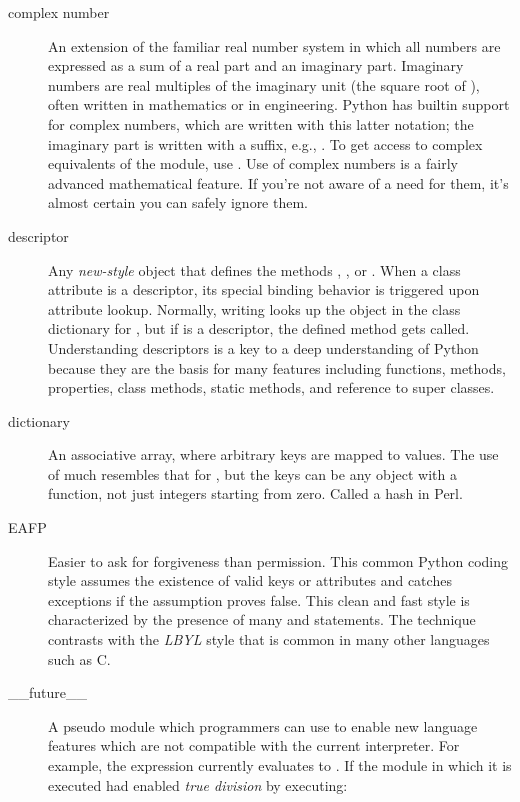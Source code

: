 \begin{description}
\item[complex number]

An extension of the familiar real number system in which all numbers are
expressed as a sum of a real part and an imaginary part.  Imaginary numbers
are real multiples of the imaginary unit (the square root of {}),
often written {} in mathematics or {} in engineering.
Python has builtin support for complex numbers, which are written with this
latter notation; the imaginary part is written with a {} suffix,
e.g., {}.  To get access to complex equivalents of the
{} module, use {}.  Use of complex numbers is a
fairly advanced mathematical feature.  If you're not aware of a need for them,
it's almost certain you can safely ignore them.

\item[descriptor]
Any \emph{new-style} object that defines the methods
{}, , or .
When a class attribute is a descriptor, its special binding behavior
is triggered upon attribute lookup.  Normally, writing  looks
up the object  in the class dictionary for , but if
{} is a descriptor, the defined method gets called.
Understanding descriptors is a key to a deep understanding of Python
because they are the basis for many features including functions,
methods, properties, class methods, static methods, and reference to
super classes.

\item[dictionary]
An associative array, where arbitrary keys are mapped to values.  The
use of  much resembles that for , but the keys
can be any object with a  function, not just
integers starting from zero.  Called a hash in Perl.

\item[EAFP]
Easier to ask for forgiveness than permission.  This common Python
coding style assumes the existence of valid keys or attributes and
catches exceptions if the assumption proves false.  This clean and
fast style is characterized by the presence of many  and
{} statements.  The technique contrasts with the
{}\emph{LBYL} style that is common in many other languages such as C.

\item[__future__]
A pseudo module which programmers can use to enable new language
features which are not compatible with the current interpreter.  For
example, the expression  currently evaluates to .
If the module in which it is executed had enabled \emph{true division}
by executing:


\end{description}
